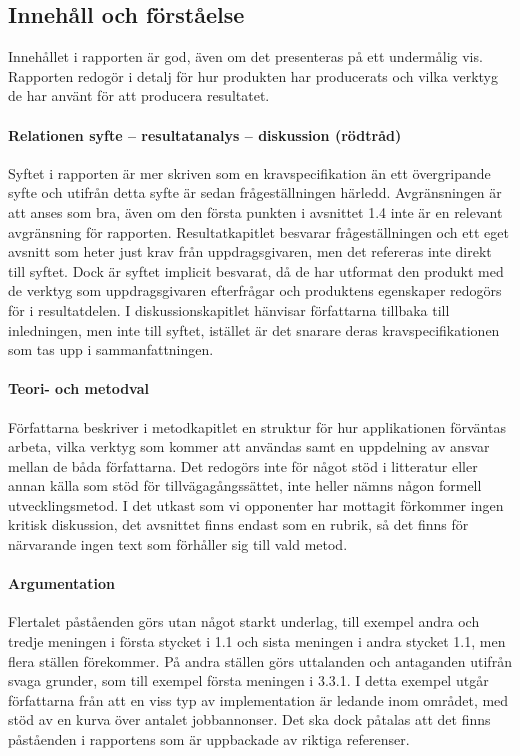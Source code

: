     \subsection{Innehåll och förståelse} %
    \label{sub:innehall}
    Innehållet i rapporten är god, även om det presenteras på ett undermålig vis. Rapporten redogör i detalj för hur produkten har producerats och vilka verktyg de har använt för att producera resultatet.

    \paragraph{Relationen syfte – resultatanalys – diskussion (rödtråd)}
        Syftet i rapporten är mer skriven som en kravspecifikation än ett övergripande syfte och utifrån detta syfte är sedan frågeställningen härledd. Avgränsningen är att anses som bra, även om den första punkten i avsnittet 1.4 inte är en relevant avgränsning för rapporten. Resultatkapitlet besvarar frågeställningen och ett eget avsnitt som heter just krav från uppdragsgivaren, men det refereras inte direkt till syftet. Dock är syftet implicit besvarat, då de har utformat den produkt med de verktyg som uppdragsgivaren efterfrågar och produktens egenskaper redogörs för i resultatdelen. I diskussionskapitlet hänvisar författarna tillbaka till inledningen, men inte till syftet, istället är det snarare deras kravspecifikationen som tas upp i sammanfattningen.

    \paragraph{Teori- och metodval}
        Författarna beskriver i metodkapitlet en struktur för hur applikationen förväntas arbeta, vilka verktyg som kommer att användas samt en uppdelning av ansvar mellan de båda författarna. Det redogörs inte för något stöd i litteratur eller annan källa som stöd för tillvägagångssättet, inte heller nämns någon formell utvecklingsmetod. I det utkast som vi opponenter har mottagit förkommer ingen kritisk diskussion, det avsnittet finns endast som en rubrik, så det finns för närvarande ingen text som förhåller sig till vald metod.

    \paragraph{Argumentation}
        Flertalet påståenden görs utan något starkt underlag, till exempel andra och tredje meningen i första stycket i 1.1 och sista meningen i andra stycket 1.1, men flera ställen förekommer. På andra ställen görs uttalanden och antaganden utifrån svaga grunder, som till exempel första meningen i 3.3.1. I detta exempel utgår författarna från att en viss typ av implementation är ledande inom området, med stöd av en kurva över antalet jobbannonser. Det ska dock påtalas att det finns påståenden i rapportens som är uppbackade av riktiga referenser.

